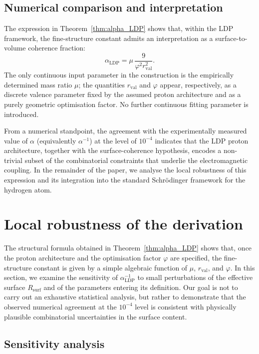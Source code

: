 \documentclass[11pt,a4paper]{article}
\theoremstyle{plain}
\theoremstyle{definition}
\theoremstyle{remark}
\begin{document}
\subsection{Numerical comparison and interpretation}

The expression in Theorem~\ref{thm:alpha_LDP} shows that, within the LDP framework, the fine-structure constant admits an interpretation as a surface-to-volume coherence fraction:
\[
\alpha_{\mathrm{LDP}}
= \mu\, \frac{9}{\varphi^2 r_{\mathrm{val}}^2}.
\]
The only continuous input parameter in the construction is the empirically determined mass ratio \(\mu\); the quantities \(r_{\mathrm{val}}\) and \(\varphi\) appear, respectively, as a discrete valence parameter fixed by the assumed proton architecture and as a purely geometric optimisation factor. No further continuous fitting parameter is introduced.

From a numerical standpoint, the agreement with the experimentally measured value of \(\alpha\) (equivalently \(\alpha^{-1}\)) at the level of \(10^{-4}\) indicates that the LDP proton architecture, together with the surface-coherence hypothesis, encodes a non-trivial subset of the combinatorial constraints that underlie the electromagnetic coupling. In the remainder of the paper, we analyse the local robustness of this expression and its integration into the standard Schrödinger framework for the hydrogen atom.

\section{Local robustness of the derivation}

The structural formula obtained in Theorem~\ref{thm:alpha_LDP} shows that, once the proton architecture and the optimisation factor \(\varphi\) are specified, the fine-structure constant is given by a simple algebraic function of \(\mu\), \(r_{\mathrm{val}}\), and \(\varphi\). In this section, we examine the sensitivity of \(\alpha_{\mathrm{LDP}}^{-1}\) to small perturbations of the effective surface \(R_{\mathrm{surf}}\) and of the parameters entering its definition. Our goal is not to carry out an exhaustive statistical analysis, but rather to demonstrate that the observed numerical agreement at the \(10^{-4}\) level is consistent with physically plausible combinatorial uncertainties in the surface content.

\subsection{Sensitivity analysis}
\end{document}
